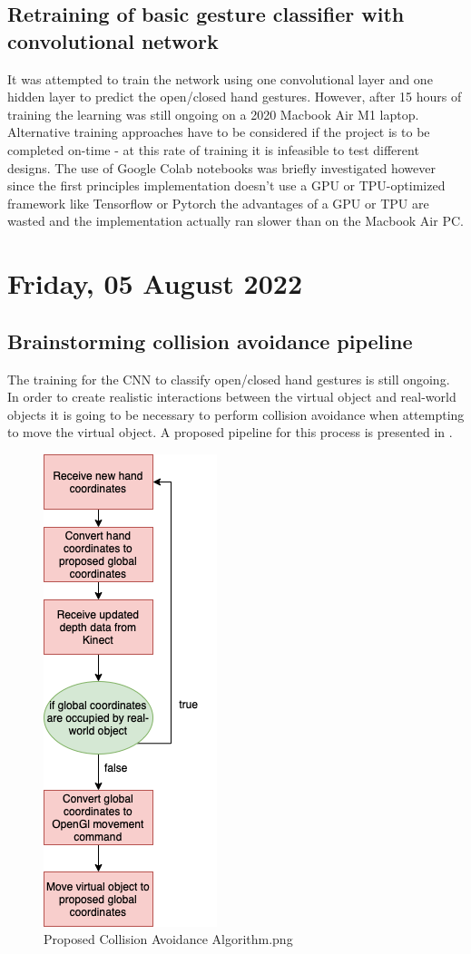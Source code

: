 \subsection{Retraining of basic gesture classifier with convolutional network}

It was attempted to train the network using one convolutional layer and one hidden layer to predict the open/closed hand gestures. However, after 15 hours of training the learning was still ongoing on a 2020 Macbook Air M1 laptop. Alternative training approaches have to be considered if the project is to be completed on-time - at this rate of training it is infeasible to test different designs. The use of Google Colab notebooks was briefly investigated however since the first principles implementation doesn't use a GPU or TPU-optimized framework like Tensorflow or Pytorch the advantages of a GPU or TPU are wasted and the implementation actually ran slower than on the Macbook Air PC. 

\section[2022/08/05]{Friday, 05 August 2022}

\subsection{Brainstorming collision avoidance pipeline}

The training for the CNN to classify open/closed hand gestures is still ongoing.\\

In order to create realistic interactions between the virtual object and real-world objects it is going to be necessary to perform collision avoidance when attempting to move the virtual object. A proposed pipeline for this process is presented in .

\begin{figure}[h]
    \centering
    \includegraphics[width=0.2\linewidth]{figures/Proposed Collision Avoidance Algorithm.png}
    \caption{Proposed Collision Avoidance Algorithm.png}
    \label{fig:Proposed Collision Avoidance Algorithm}
\end{figure}

